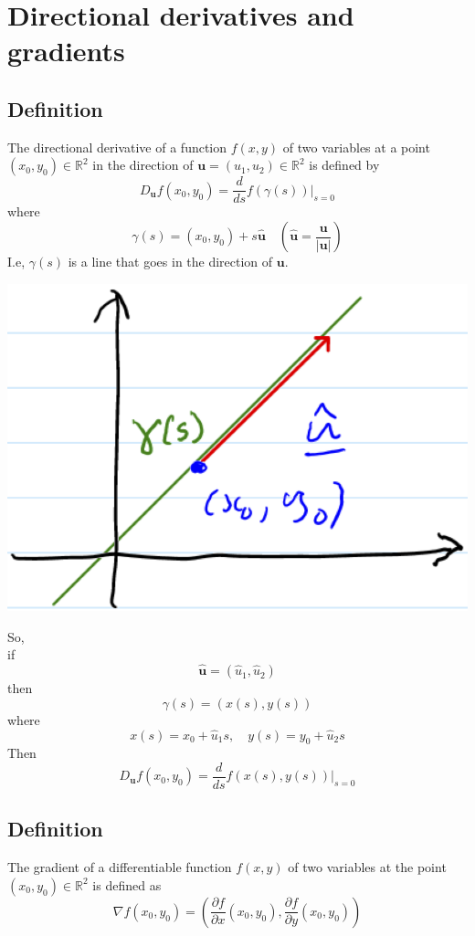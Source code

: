 \documentclass[11pt]{article}
\newcommand{\reals}{\mathbb{R}}
\renewcommand{\vec}[1]{\mathbf{#1}}
\begin{document}
\section{Directional derivatives and gradients}
\subsection{Definition}
The directional derivative of a function $f(x, y)$ of two variables at a point $(x_0, y_0) \in \reals^2$ in the direction of $\vec{u} = (u_1, u_2) \in \reals^2$ is defined by
\[ D_\vec{u} f(x_0, y_0) = \frac{d}{ds} f(\gamma (s))|_{s=0} \]
where
\[ \gamma(s) = (x_0, y_0) + s \vec{\hat{u}} \quad \left( \vec{\hat{u}} = \frac{\vec{u}}{|\vec{u}|} \right) \]
I.e, $\gamma(s)$ is a line that goes in the direction of $\vec{u}$.

\begin{center} \includegraphics[scale=1]{gamma_line} \end{center}

So,\\
if 
\[ \vec{\hat{u}} = (\hat{u}_1, \hat{u}_2) \]
then 
\[ \gamma(s) = (x(s), y(s)) \]
where 
\[ x(s) = x_0 + \hat{u}_1 s, \quad y(s) = y_0 + \hat{u}_2 s \]
Then
\[ D_\vec{u}f(x_0, y_0) = \frac{d}{ds} f(x(s), y(s)) |_{s=0} \]

\subsection{Definition}
The gradient of a differentiable function $f(x, y)$ of two variables at the point $(x_0, y_0) \in \reals^2$ is defined as
\[ \nabla f(x_0, y_0) = \left( \frac{\partial f}{\partial x}(x_0, y_0), \frac{\partial f}{\partial y}(x_0, y_0) \right) \]
\end{document}
